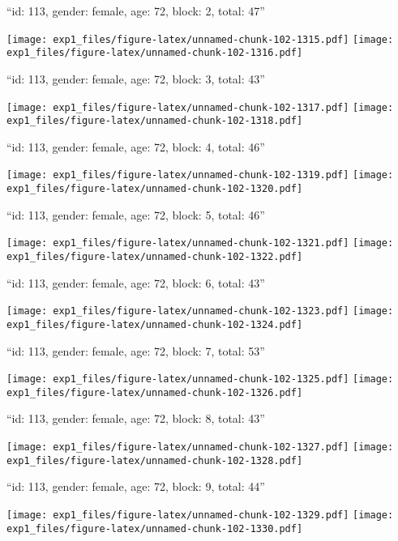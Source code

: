 \documentclass[11pt,,]{article}
\begin{document}
\newpage
[1] 

``id: 113, gender: female, age: 72, block: 2, total: 47''

\texttt{[image: exp1\_files/figure-latex/unnamed-chunk-102-1315.pdf]}
\texttt{[image: exp1\_files/figure-latex/unnamed-chunk-102-1316.pdf]}

\newpage
[1] 

``id: 113, gender: female, age: 72, block: 3, total: 43''

\texttt{[image: exp1\_files/figure-latex/unnamed-chunk-102-1317.pdf]}
\texttt{[image: exp1\_files/figure-latex/unnamed-chunk-102-1318.pdf]}

\newpage
[1] 

``id: 113, gender: female, age: 72, block: 4, total: 46''

\texttt{[image: exp1\_files/figure-latex/unnamed-chunk-102-1319.pdf]}
\texttt{[image: exp1\_files/figure-latex/unnamed-chunk-102-1320.pdf]}

\newpage
[1] 

``id: 113, gender: female, age: 72, block: 5, total: 46''

\texttt{[image: exp1\_files/figure-latex/unnamed-chunk-102-1321.pdf]}
\texttt{[image: exp1\_files/figure-latex/unnamed-chunk-102-1322.pdf]}

\newpage
[1] 

``id: 113, gender: female, age: 72, block: 6, total: 43''

\texttt{[image: exp1\_files/figure-latex/unnamed-chunk-102-1323.pdf]}
\texttt{[image: exp1\_files/figure-latex/unnamed-chunk-102-1324.pdf]}

\newpage
[1] 

``id: 113, gender: female, age: 72, block: 7, total: 53''

\texttt{[image: exp1\_files/figure-latex/unnamed-chunk-102-1325.pdf]}
\texttt{[image: exp1\_files/figure-latex/unnamed-chunk-102-1326.pdf]}

\newpage
[1] 

``id: 113, gender: female, age: 72, block: 8, total: 43''

\texttt{[image: exp1\_files/figure-latex/unnamed-chunk-102-1327.pdf]}
\texttt{[image: exp1\_files/figure-latex/unnamed-chunk-102-1328.pdf]}

\newpage
[1] 

``id: 113, gender: female, age: 72, block: 9, total: 44''

\texttt{[image: exp1\_files/figure-latex/unnamed-chunk-102-1329.pdf]}
\texttt{[image: exp1\_files/figure-latex/unnamed-chunk-102-1330.pdf]}
\end{document}
